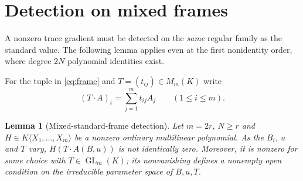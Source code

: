\documentclass[11pt,reqno]{amsart}
\theoremstyle{plain}
\newtheorem{lemma}[theorem]{Lemma}
\theoremstyle{definition}
\numberwithin{equation}{section}
\begin{document}
\section{Detection on mixed frames}\label{sec:mixed}
A nonzero trace gradient must be detected on the \emph{same} regular family as the standard value.  The following lemma applies even at the first nonidentity order, where degree $2N$ polynomial identities exist.

For the tuple in \eqref{eq:frame} and $T=(t_{ij})\in M_m(K)$ write
\[
 (T\cdot A)_i=\sum_{j=1}^m t_{ij}A_j\qquad(1\le i\le m).
\]
\begin{lemma}[Mixed-standard-frame detection]\label{lem:mixed}
Let $m=2r$, $N\ge r$ and $H\in K\langle X_1,\ldots,X_m\rangle$ be a nonzero ordinary multilinear polynomial.  As the $B_i$, $u$ and $T$ vary, $H(T\cdot A(B,u))$ is not identically zero.  Moreover, it is nonzero for some choice with $T\in\operatorname{GL}_m(K)$; its nonvanishing defines a nonempty open condition on the irreducible parameter space of $B,u,T$.
\end{lemma}
\end{document}
